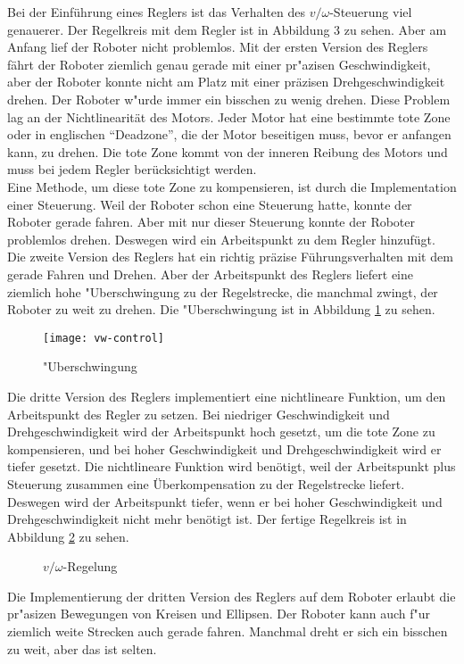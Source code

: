 Bei der Einführung eines Reglers ist das Verhalten des \(v/\omega\)-Steuerung viel genauerer. Der Regelkreis mit dem Regler ist in Abbildung 3 zu sehen. Aber am Anfang lief der Roboter nicht problemlos. Mit der ersten Version des Reglers fährt der Roboter ziemlich genau gerade mit einer pr"azisen Geschwindigkeit, aber der Roboter konnte nicht am Platz mit einer präzisen Drehgeschwindigkeit drehen. Der Roboter w"urde immer ein bisschen zu wenig drehen. Diese Problem lag an der Nichtlinearität des Motors. Jeder Motor hat eine bestimmte tote Zone oder in englischen “Deadzone”, die der Motor beseitigen muss, bevor er anfangen kann, zu drehen. Die tote Zone kommt von der inneren Reibung des Motors und muss bei jedem Regler berücksichtigt werden. \\

Eine Methode, um diese tote Zone zu kompensieren, ist durch die Implementation einer Steuerung. Weil der Roboter schon eine Steuerung hatte, konnte der Roboter gerade fahren. Aber mit nur dieser Steuerung konnte der Roboter problemlos drehen. Deswegen wird ein Arbeitspunkt zu dem Regler hinzufügt. \\

Die zweite Version des Reglers hat ein richtig präzise Führungsverhalten mit dem gerade Fahren und Drehen. Aber der Arbeitspunkt des Reglers liefert eine ziemlich hohe "Uberschwingung zu der Regelstrecke, die manchmal zwingt, der Roboter zu weit zu drehen. Die "Uberschwingung ist in Abbildung \ref{fig:vw-control} zu sehen. \\ 

\begin{figure}
    \centering
    \texttt{[image: vw-control]}
    \caption{"Uberschwingung}
    \label{fig:vw-control}
\end{figure}

Die dritte Version des Reglers implementiert eine nichtlineare Funktion, um den Arbeitspunkt des Regler zu setzen. Bei niedriger Geschwindigkeit und Drehgeschwindigkeit wird der Arbeitspunkt hoch gesetzt, um die tote Zone zu kompensieren, und bei hoher Geschwindigkeit und Drehgeschwindigkeit wird er tiefer gesetzt. Die nichtlineare Funktion wird benötigt, weil der Arbeitspunkt plus Steuerung zusammen eine Überkompensation zu der Regelstrecke liefert. Deswegen wird der Arbeitspunkt tiefer, wenn er bei hoher Geschwindigkeit und Drehgeschwindigkeit nicht mehr benötigt ist. Der fertige Regelkreis ist in Abbildung \ref{fig:regelung} zu sehen. \\

\begin{figure}
    \centering
    
    \caption{\(v/\omega\)-Regelung}
    \label{fig:regelung}
\end{figure}

Die Implementierung der dritten Version des Reglers auf dem Roboter erlaubt die pr"asizen Bewegungen von Kreisen und Ellipsen. Der Roboter kann auch f"ur ziemlich weite Strecken auch gerade fahren. Manchmal dreht er sich ein bisschen zu weit, aber das ist selten.

